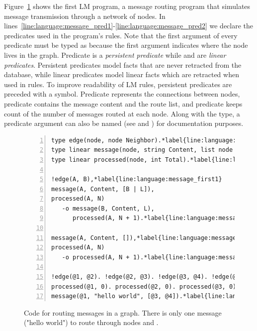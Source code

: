 
Figure~\ref{code:language:message} shows the first LM program, a message routing
program that simulates message transmission through a network of nodes. In
lines~\ref{line:language:message_pred1}-\ref{line:language:message_pred2} we
declare the predicates used in the program's rules. Note that the first argument
of every predicate must be typed as  because the first argument
indicates where the node lives in the graph. Predicate  is a
\emph{persistent predicate} while  and  are
\emph{linear predicates}. Persistent predicates model facts that are never
retracted from the database, while linear predicates model linear facts which
are retracted when used in rules. To improve readability of LM rules, persistent
predicates are preceded with a \code{!} symbol. Predicate  represents
the connections between nodes, predicate  contains the message
content and the route list, and predicate  keeps count of the
number of messages routed at each node. Along with the type, a predicate
argument can also be named (see  and ) for
documentation purposes.

\begin{figure}[h!]
\begin{Verbatim}[numbers=left,commandchars=\*\{\},fontsize=\codesize]
type edge(node, node Neighbor).*label{line:language:message_pred1}
type linear message(node, string Content, list node Routing).
type linear processed(node, int Total).*label{line:language:message_pred2}

!edge(A, B),*label{line:language:message_first1}
message(A, Content, [B | L]),
processed(A, N)
   -o message(B, Content, L),
      processed(A, N + 1).*label{line:language:message_first2}

message(A, Content, []),*label{line:language:message_second1}
processed(A, N)
   -o processed(A, N + 1).*label{line:language:message_second2}

!edge(@1, @2). !edge(@2, @3). !edge(@3, @4). !edge(@1, @3).*label{line:language:message_axioms}
processed(@1, 0). processed(@2, 0). processed(@3, 0). processed(@4, 0).
message(@1, "hello world", [@3, @4]).*label{line:language:message_message}
\end{Verbatim}
\caption{Code for routing messages in a graph. There is only one message ("hello
world") to route through nodes  and .}
\label{code:language:message}
\end{figure}


